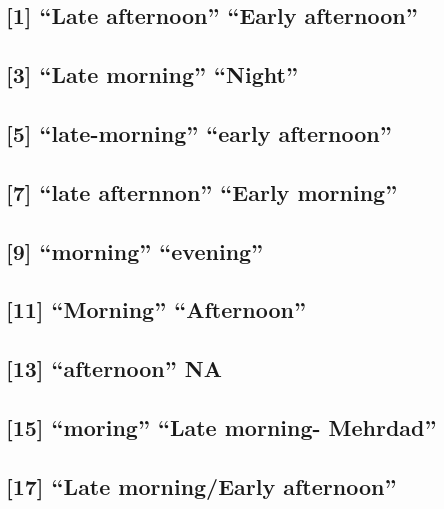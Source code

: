 \documentclass[]{article}
\begin{document}
\hypertarget{late-afternoon-early-afternoon}{%
\subsection{{[}1{]} ``Late afternoon'' ``Early
afternoon''}\label{late-afternoon-early-afternoon}}

\hypertarget{late-morning-night}{%
\subsection{{[}3{]} ``Late morning''
``Night''}\label{late-morning-night}}

\hypertarget{late-morning-early-afternoon}{%
\subsection{{[}5{]} ``late-morning'' ``early
afternoon''}\label{late-morning-early-afternoon}}

\hypertarget{late-afternnon-early-morning}{%
\subsection{{[}7{]} ``late afternnon'' ``Early
morning''}\label{late-afternnon-early-morning}}

\hypertarget{morning-evening}{%
\subsection{{[}9{]} ``morning'' ``evening''}\label{morning-evening}}

\hypertarget{morning-afternoon}{%
\subsection{{[}11{]} ``Morning''
``Afternoon''}\label{morning-afternoon}}

\hypertarget{afternoon-na}{%
\subsection{{[}13{]} ``afternoon'' NA}\label{afternoon-na}}

\hypertarget{moring-late-morning--mehrdad}{%
\subsection{{[}15{]} ``moring'' ``Late morning-
Mehrdad''}\label{moring-late-morning--mehrdad}}

\hypertarget{late-morningearly-afternoon}{%
\subsection{{[}17{]} ``Late morning/Early
afternoon''}\label{late-morningearly-afternoon}}
\end{document}
